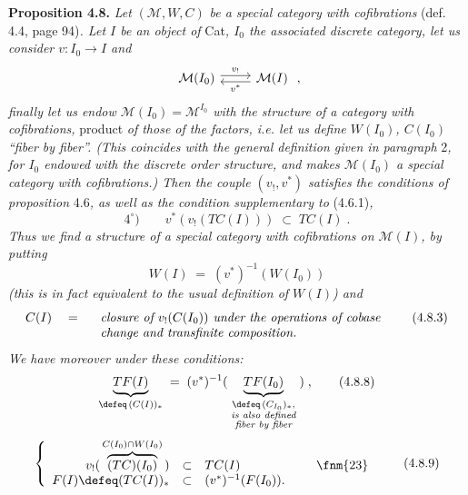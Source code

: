 \textbf{Proposition 4.8.} \textit{Let} $(\mathcal{M}, W, C)$ \textit{be a special category with cofibrations} (def. 4.4, page 94)\textit{. Let $I$ be an object of} Cat\textit{, $I_0$ the associated discrete category, let us consider $v : I_0 \longrightarrow I$ and} %
\[
\begin{tikzcd}
\mathcal{M}(I_0) \arrow[r, shift left, "v_{!}"] & \mathcal{M}(I) \arrow[l, shift left, "v^{*}"]
\end{tikzcd} \; ,
\]
\textit{finally let us endow $\mathcal{M}(I_0) = \mathcal{M}^{I_0}$ with the structure of a category with cofibrations,} product \textit{of those of the factors, i.e. let us define $W(I_0)$, $C(I_0)$ ``fiber by fiber''. (This coincides with the general definition given in paragraph} 2\textit{, for $I_0$ endowed with the discrete order structure, and makes $\mathcal{M}(I_0)$ a special category with cofibrations.) Then the couple $(v_{!}, v^{*})$ satisfies}  \textit{the conditions of proposition} 4.6\textit{, as well as the condition supplementary to} (4.6.1)\textit{,}
\[
4^{\circ}) \qquad v^{*}(v_{!}(TC(I))) \;\subset\; TC(I) \; .
\tag*{(4.8.1)}
\]
\textit{Thus we find a structure of a special category with cofibrations on $\mathcal{M}(I)$, by putting}
\[
W(I) \;=\; (v^{*})^{-1}(W(I_0))
\tag*{(4.8.2)}
\]
\textit{(this is in fact equivalent to the usual definition of $W(I)$) and}
\[
C(I) \quad = \quad
\begin{array}[t]{l}
\textit{closure of } v_{!}(C(I_0)) \textit{ under the operations of cobase}\\
\textit{change and transfinite composition.}
\end{array}
\tag*{(4.8.3)}
\]
\textit{We have moreover under these conditions:}
\[
\underbrace{TF(I)}_{\defeq\,(C(I))_{*}} \;=\; (v^{*})^{-1}( \; \underbrace{TF(I_0)}_{\substack{\defeq\,(C_{I_0})_{*},\\ \textit{is also defined}\\ \textit{fiber by fiber}}} \; ) \; ,
\tag*{(4.8.8)}
\]
\[
\left\{
\begin{array}{rcl}
v_{!}( \, \overbrace{(TC)(I_0)}^{C(I_0)\cap W(I_0)} \, ) & \subset & TC(I) \qquad\qquad\qquad \text{\fnm{23}} \\
F(I) \defeq (TC(I))_{*} & \subset & (v^{*})^{-1}(F(I_0)).
\end{array}
\right.
\tag*{(4.8.9)}
\]

